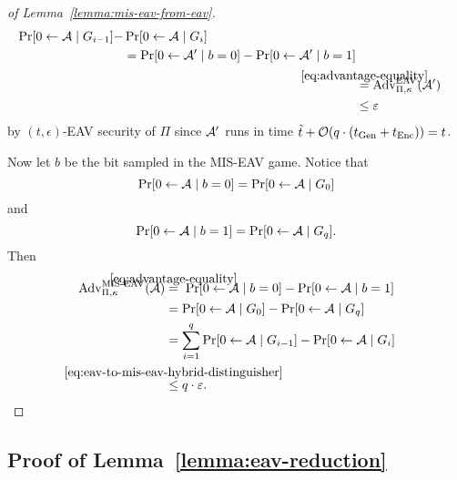 \begin{proof}[of Lemma~\ref{lemma:mis-eav-from-eav}]
\begin{align}
		\begin{split}
			\begin{split}
				\pr{0 \from \adv \mid G_{i - 1}} - & \pr{0 \from \adv \mid G_{i}} \\
				& = \pr{0 \from \adv' \mid b = 0} - \pr{0 \from \adv' \mid b = 1}
			\end{split} \\
			& \stackrel{\mathclap{\eqref{eq:advantage-equality}}}{=} \advantage{\Pi}{\kappa}{EAV}(\adv')                                         \\
			& \le \epsilon
		\end{split}
	\end{align}
	by $(t, \epsilon)$-EAV security of $\Pi$ since $\mathcal{A}'$ runs in time $\tilde{t} + \mathcal{O}(q \cdot (t_{\mathrm{Gen}} + t_{\mathrm{Enc}})) = t$.

	Now let $b$ be the bit sampled in the MIS-EAV game. Notice that
	\[
		\pr{0 \from \adv \mid b = 0} = \pr{0 \from \adv \mid G_0}
	\]
	and
	\[
		\pr{0 \from \adv \mid b = 1} = \pr{0 \from \adv \mid G_q}.
	\]
	Then
	\begin{align*}
		\advantage{\Pi}{\kappa}{MIS\text{-}EAV}(\adv) & \stackrel{\mathclap{\eqref{eq:advantage-equality}}}{=} \; \pr{0 \from \adv \mid b = 0} - \pr{0 \from \adv \mid b = 1} \\
		                                              & = \pr{0 \from \adv \mid G_0} - \pr{0 \from \adv \mid G_q}                                                             \\
		                                              & = \sum_{i = 1}^{q} \pr{0 \from \adv \mid G_{i - 1}} - \pr{0 \from \adv \mid G_i}                                      \\
		                                              & \stackrel{\mathclap{\eqref{eq:eav-to-mis-eav-hybrid-distinguisher}}}{\le} q \cdot \epsilon.
	\end{align*}
\end{proof}

\subsection{Proof of Lemma~\ref{lemma:eav-reduction}} \label{sec:eav-reduction-proof}

